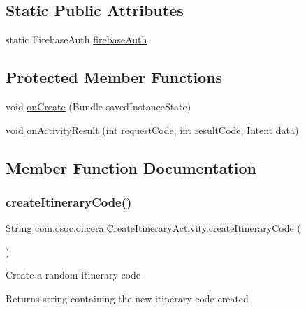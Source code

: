 \subsection*{Static Public Attributes}
\begin{DoxyCompactItemize}
\item 
static Firebase\+Auth \mbox{\hyperlink{classcom_1_1osoc_1_1oncera_1_1_create_itinerary_activity_ab0c5a552c3170ef5a07c8cea31814138}{firebase\+Auth}}
\end{DoxyCompactItemize}
\subsection*{Protected Member Functions}
\begin{DoxyCompactItemize}
\item 
void \mbox{\hyperlink{classcom_1_1osoc_1_1oncera_1_1_create_itinerary_activity_ab0ef7aea324d02ccf17c395d8da8a8c4}{on\+Create}} (Bundle saved\+Instance\+State)
\item 
void \mbox{\hyperlink{classcom_1_1osoc_1_1oncera_1_1_create_itinerary_activity_a2f8e5f5fc7b72df04fd51553059cd210}{on\+Activity\+Result}} (int request\+Code, int result\+Code, Intent data)
\end{DoxyCompactItemize}


\subsection{Member Function Documentation}
\mbox{\label{classcom_1_1osoc_1_1oncera_1_1_create_itinerary_activity_a9a403b6a9b06144fa44757b687873e95}} 
\subsubsection{\texorpdfstring{createItineraryCode()}{createItineraryCode()}}
{\footnotesize\ttfamily String com.\+osoc.\+oncera.\+Create\+Itinerary\+Activity.\+create\+Itinerary\+Code (\begin{DoxyParamCaption}{ }\end{DoxyParamCaption})}

Create a random itinerary code \begin{DoxyReturn}{Returns}
string containing the new itinerary code created 
\end{DoxyReturn}
\mbox{\label{classcom_1_1osoc_1_1oncera_1_1_create_itinerary_activity_aa346c6d0c42a870a7868be7a21b47eb5}} 
